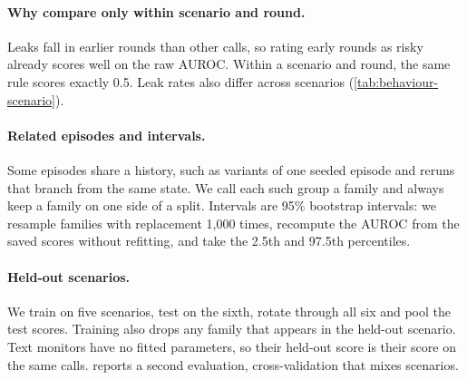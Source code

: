 \begin{table}[h]
  \centering
  \small
  \setlength{\tabcolsep}{3pt}
  
  \caption{Scenario-and-round groups kept by the metric, and the leaking calls they contain, for each headline test.}
  \label{tab:group-coverage}
\end{table}

\paragraph{Why compare only within scenario and round.}
Leaks fall in earlier rounds than other calls, so rating early rounds as risky already scores well on the raw AUROC.
Within a scenario and round, the same rule scores exactly 0.5.
Leak rates also differ across scenarios (\cref{tab:behaviour-scenario}).

\paragraph{Related episodes and intervals.}
Some episodes share a history, such as variants of one seeded episode and reruns that branch from the same state.
We call each such group a family and always keep a family on one side of a split.
Intervals are 95\% bootstrap intervals: we resample families with replacement 1,000 times, recompute the AUROC from the saved scores without refitting, and take the 2.5th and 97.5th percentiles.

\paragraph{Held-out scenarios.}
We train on five scenarios, test on the sixth, rotate through all six and pool the test scores.
Training also drops any family that appears in the held-out scenario.
Text monitors have no fitted parameters, so their held-out score is their score on the same calls.
 reports a second evaluation, cross-validation that mixes scenarios.
